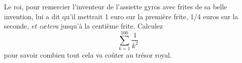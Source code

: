 \begin{exercice}\label{exoMatlab0003}

Le roi, pour remercier l'inventeur de l'assiette gyros avec frites de sa belle invention, lui a dit qu'il mettrait 1 euro sur la première frite, 1/4 euros sur la seconde, \emph{et c\ae tera} jusqu'à la centième frite. Calculez
\[ \sum_{k=1}^{100}\frac{1}{ k^2 } \]
pour savoir combien tout cela va coûter au trésor royal.

\end{exercice}
